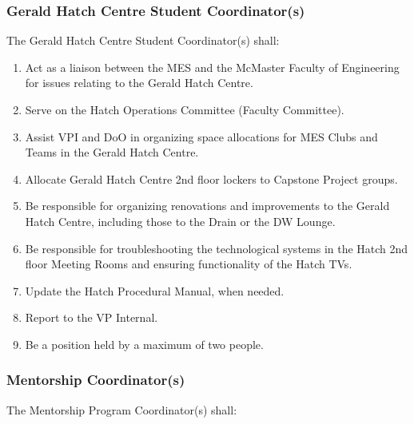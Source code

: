 \subsubsection{Gerald Hatch Centre Student Coordinator(s)}
\label{gerald-hatch-centre-student-coordinators}
The Gerald Hatch Centre Student Coordinator(s) shall:

\begin{enumerate}
 \item
  Act as a liaison between the MES and the McMaster Faculty of Engineering for issues relating to the Gerald Hatch Centre.
 \item
  Serve on the Hatch Operations Committee (Faculty Committee).
 \item
  Assist VPI and DoO in organizing space allocations for MES Clubs and Teams in the Gerald Hatch Centre. 
 \item    
  Allocate Gerald Hatch Centre 2nd floor lockers to Capstone Project groups.
 \item
  Be responsible for organizing renovations and improvements to the Gerald Hatch Centre, including those to the Drain or the DW Lounge.
 \item
  Be responsible for troubleshooting the technological systems in the Hatch 2nd floor Meeting Rooms and ensuring functionality of the Hatch TVs.
 \item
  Update the Hatch Procedural Manual, when needed.
 \item
  Report to the VP Internal.
 \item
  Be a position held by a maximum of two people.

\end{enumerate}

\subsubsection{Mentorship Coordinator(s)}
\label{mentorship-coordinators}
The Mentorship Program Coordinator(s) shall:

